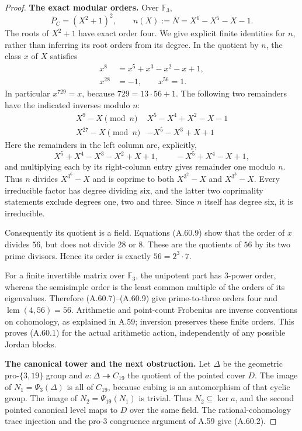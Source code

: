 \begin{proof}
\medskip\noindent\textbf{The exact modular orders.}
Over $\mathbb F _3$,
\[
 \overline P_C=(X^2+1)^2,
 \qquad n(X):=\overline N=X^6-X^5-X-1.                       \tag{A.60.8}
\]
The roots of $X^2+1$ have exact order four.
We give explicit finite identities for $n$, rather than
inferring its root orders from its degree.
In the quotient by $n$, the class $x$ of $X$ satisfies
\[
\begin{split}
 x^8&=x^5+x^3-x^2-x+1,\\
 x^{28}&=-1,\qquad x^{56}=1.
\end{split}                                                   \tag{A.60.9}
\]
In particular $x^{729}=x$, because $729=13\cdot56+1$.
The following two remainders have the indicated inverses
modulo $n$:
\[
\begin{array}{c|c}
 X^9-X\pmod n & X^5-X^4+X^2-X-1\\
 X^{27}-X\pmod n & -X^5-X^3+X+1
\end{array}                                                   \tag{A.60.10}
\]
Here the remainders in the left column are, explicitly,
\[
 X^5+X^4-X^3-X^2+X+1,
              \qquad -X^5+X^4-X+1,
\]
and multiplying each by its right-column entry gives
remainder one modulo $n$.
Thus $n$ divides $X^{3^6}-X$ and is coprime to both
$X^{3^2}-X$ and $X^{3^3}-X$.
Every irreducible factor has degree dividing six, and
the latter two coprimality statements exclude degrees
one, two and three.  Since $n$ itself has degree six,
it is irreducible.

Consequently its quotient is a field.  Equations
(A.60.9) show that the order of $x$ divides $56$, but
does not divide $28$ or $8$.  These are the quotients
of $56$ by its two prime divisors.  Hence its order is
exactly $56=2^3\cdot7$.

For a finite invertible matrix over $\mathbb F _3$,
the unipotent part has $3$-power order, whereas the
semisimple order is the least common multiple of the
orders of its eigenvalues.  Therefore (A.60.7)--(A.60.9)
give prime-to-three orders four and
$\operatorname{lcm}(4,56)=56$.
Arithmetic and point-count Frobenius are inverse
conventions on cohomology, as explained in A.59;
inversion preserves these finite orders.
This proves (A.60.1) for the actual arithmetic action,
independently of any possible Jordan blocks.

\medskip\noindent\textbf{The canonical tower and the next obstruction.}
Let $\Delta$ be the geometric pro-$\{3,19\}$ group and
$a:\Delta\twoheadrightarrow C_{19}$ the quotient of
the pointed cover $D$.
The image of $N_1=\Psi_3(\Delta)$ is all of $C_{19}$,
because cubing is an automorphism of that cyclic group.
The image of $N_2=\Psi_{19}(N_1)$ is trivial.
Thus $N_2\subseteq\ker a$, and the second pointed
canonical level maps to $D$ over the same field.
The rational-cohomology trace injection and the pro-$3$
congruence argument of A.59 give (A.60.2).


\end{proof}
